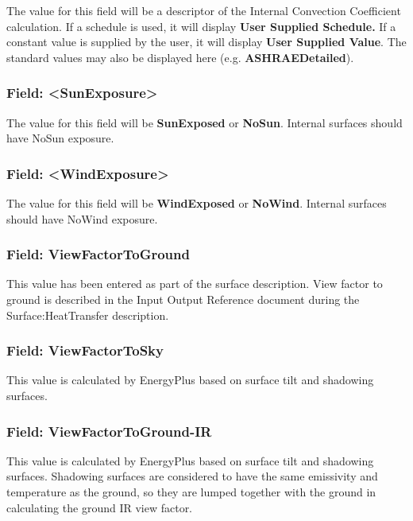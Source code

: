 The value for this field will be a descriptor of the Internal Convection Coefficient calculation. If a schedule is used, it will display \textbf{User Supplied Schedule.} If a constant value is supplied by the user, it will display \textbf{User Supplied Value}. The standard values may also be displayed here (e.g. \textbf{ASHRAEDetailed}).

\subsubsection{Field: \textless{}SunExposure\textgreater{}}\label{field-sunexposure}

The value for this field will be \textbf{SunExposed} or \textbf{NoSun}. Internal surfaces should have NoSun exposure.

\subsubsection{Field: \textless{}WindExposure\textgreater{}}\label{field-windexposure}

The value for this field will be \textbf{WindExposed} or \textbf{NoWind}. Internal surfaces should have NoWind exposure.

\subsubsection{Field: ViewFactorToGround}\label{field-viewfactortoground}

This value has been entered as part of the surface description. View factor to ground is described in the Input Output Reference document during the Surface:HeatTransfer description.

\subsubsection{Field: ViewFactorToSky}\label{field-viewfactortosky}

This value is calculated by EnergyPlus based on surface tilt and shadowing surfaces.

\subsubsection{Field: ViewFactorToGround-IR}\label{field-viewfactortoground-ir}

This value is calculated by EnergyPlus based on surface tilt and shadowing surfaces. Shadowing surfaces are considered to have the same emissivity and temperature as the ground, so they are lumped together with the ground in calculating the ground IR view factor.

